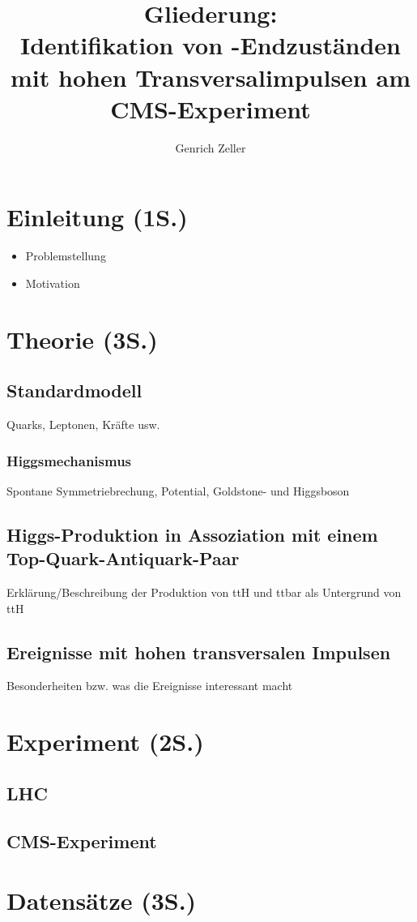 \documentclass[12pt,a4paper]{article}
\title{Gliederung:\\\textbf{Identifikation von \tth -Endzuständen mit hohen Transversalimpulsen am CMS-Experiment}}
\author{Genrich Zeller}
\begin{document}
\maketitle
\tableofcontents
\newpage
\section{Einleitung (1S.)}
\begin{itemize}
\item Problemstellung
\item Motivation
\end{itemize}
\section{Theorie (3S.)}
\subsection{Standardmodell}
Quarks, Leptonen, Kräfte usw.
\subsubsection{Higgsmechanismus}
Spontane Symmetriebrechung, Potential, Goldstone- und Higgsboson
\subsection{Higgs-Produktion in Assoziation mit einem Top-Quark-Antiquark-Paar}
Erklärung/Beschreibung der Produktion von ttH und ttbar als Untergrund von ttH
\subsection{Ereignisse mit hohen transversalen Impulsen}
Besonderheiten bzw. was die Ereignisse interessant macht
\section{Experiment (2S.)}
\subsection{LHC}
\subsection{CMS-Experiment}
\section{Datensätze (3S.)}
\end{document}
